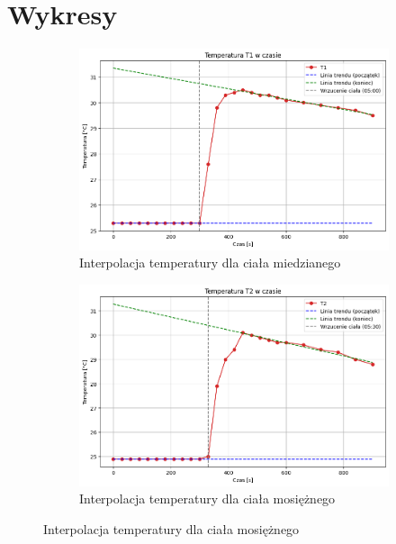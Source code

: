 \documentclass[a4paper,12pt]{article}
\begin{document}

\newpage

\section{Wykresy}

\begin{figure}[H]
    \centering
    \begin{subfigure}[b]{0.65\textwidth}
        \includegraphics[width=\textwidth]{t1_interpolacja.png}
        \caption{Interpolacja temperatury dla ciała miedzianego}
        \label{fig:t1_interpolacja}
    \end{subfigure}

    \begin{subfigure}[b]{0.65\textwidth}
        \includegraphics[width=\textwidth]{t2_interpolacja.png}
        \caption{Interpolacja temperatury dla ciała mosiężnego}
        \label{fig:t2_interpolacja}
    \end{subfigure}


\end{figure}
\end{document}

